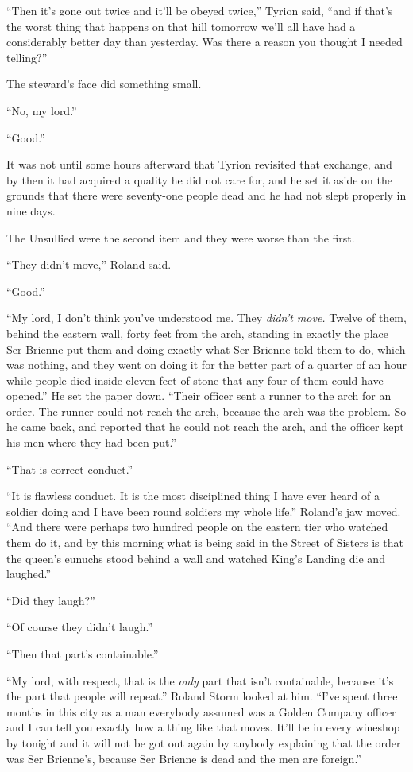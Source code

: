 “Then it’s gone out twice and it’ll be obeyed twice,” Tyrion said, “and if that’s the worst thing that happens on that hill tomorrow we’ll all have had a considerably better day than yesterday. Was there a reason you thought I needed telling?”

The steward’s face did something small.

“No, my lord.”

“Good.”

It was not until some hours afterward that Tyrion revisited that exchange, and by then it had acquired a quality he did not care for, and he set it aside on the grounds that there were seventy-one people dead and he had not slept properly in nine days.

\sceneBreak

The Unsullied were the second item and they were worse than the first.

“They didn’t move,” Roland said.

“Good.”

“My lord, I don’t think you’ve understood me. They \textit{didn’t move.} Twelve of them, behind the eastern wall, forty feet from the arch, standing in exactly the place Ser Brienne put them and doing exactly what Ser Brienne told them to do, which was nothing, and they went on doing it for the better part of a quarter of an hour while people died inside eleven feet of stone that any four of them could have opened.” He set the paper down. “Their officer sent a runner to the arch for an order. The runner could not reach the arch, because the arch was the problem. So he came back, and reported that he could not reach the arch, and the officer kept his men where they had been put.”

“That is correct conduct.”

“It is flawless conduct. It is the most disciplined thing I have ever heard of a soldier doing and I have been round soldiers my whole life.” Roland’s jaw moved. “And there were perhaps two hundred people on the eastern tier who watched them do it, and by this morning what is being said in the Street of Sisters is that the queen’s eunuchs stood behind a wall and watched King’s Landing die and laughed.”

“Did they laugh?”

“Of course they didn’t laugh.”

“Then that part’s containable.”

“My lord, with respect, that is the \textit{only} part that isn’t containable, because it’s the part that people will repeat.” Roland Storm looked at him. “I’ve spent three months in this city as a man everybody assumed was a Golden Company officer and I can tell you exactly how a thing like that moves. It’ll be in every wineshop by tonight and it will not be got out again by anybody explaining that the order was Ser Brienne’s, because Ser Brienne is dead and the men are foreign.”

